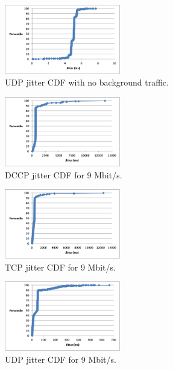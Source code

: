 \begin{figure}[!h]
   \centering
      \includegraphics[width=0.45\textwidth]{pics/udp_none_jitter}
   \caption{UDP jitter CDF with no background traffic.}
\label{fig:udp_none_jitter}
\end{figure}

\begin{figure}[!h]
   \centering
      \includegraphics[width=0.45\textwidth]{pics/dccp_9_jitter_new}
   \caption{DCCP jitter CDF for 9 Mbit/s.}
\label{fig:dccp_9_jitter}
\end{figure}

\begin{figure}[!h]
   \centering
      \includegraphics[width=0.45\textwidth]{pics/tcp_9_jitter}
   \caption{TCP jitter CDF for 9 Mbit/s.}
\label{fig:tcp_9_jitter}
\end{figure}

\begin{figure}[!h]
   \centering
      \includegraphics[width=0.45\textwidth]{pics/udp_9_jitter}
   \caption{UDP jitter CDF for 9 Mbit/s.}
\label{fig:udp_9_jitter}
\end{figure}

